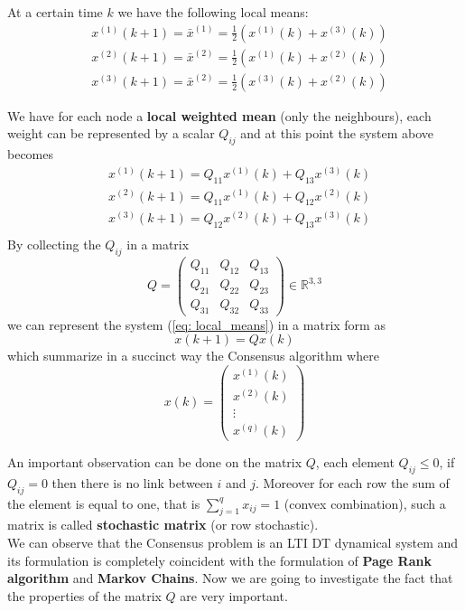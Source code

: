 At a certain time $k$ we have the following local means:
\begin{equation}    \label{eq: local_means}
    \begin{aligned}
        &x^{(1)}(k+1)=\bar{x}^{(1)} = \frac{1}{2} (x^{(1)}(k)+x^{(3)}(k))\\
        &x^{(2)}(k+1)=\bar{x}^{(2)} = \frac{1}{2} (x^{(1)}(k)+x^{(2)}(k))\\
        &x^{(3)}(k+1)=\bar{x}^{(2)} = \frac{1}{2} (x^{(3)}(k)+x^{(2)}(k))
    \end{aligned}
\end{equation}

\noindent
We have for each node a \textbf{local weighted mean} (only the neighbours), each weight can be represented by a scalar $Q_{ij}$ and at this point the system above becomes
\begin{equation}
    \begin{aligned}
        &x^{(1)}(k+1)= Q_{11} x^{(1)}(k)+Q_{13}x^{(3)}(k)\\
        &x^{(2)}(k+1)= Q_{11} x^{(1)}(k)+Q_{12}x^{(2)}(k)\\
        &x^{(3)}(k+1)= Q_{12} x^{(2)}(k)+Q_{13}x^{(3)}(k)\\
    \end{aligned}
\end{equation}
By collecting the $Q_{ij}$ in a matrix 
$$Q=\begin{pmatrix}
    Q_{11}&Q_{12}&Q_{13}\\
    Q_{21}&Q_{22}&Q_{23}\\
    Q_{31}&Q_{32}&Q_{33}
\end{pmatrix}
    \in\mathbb{R}^{3,3}$$
we can represent the system (\ref{eq: local_means}) in a matrix form as
\begin{equation}
    x(k+1)=Qx(k)
\end{equation}
which summarize in a succinct way the Consensus algorithm where
$$x(k)=\begin{pmatrix} x^{(1)}(k)\\x^{(2)}(k)\\\vdots\\x^{(q)}(k) \end{pmatrix}$$ 

An important observation can be done on the matrix $Q$, each element $Q_{ij}\le 0$, if $Q_{ij}=0$ then there is no link between $i$ and $j$. Moreover for each row the sum of the element is equal to one, that is $\sum_{j=1}^q x_{ij}=1$ (convex combination), such a matrix is called \textbf{stochastic matrix} (or row stochastic).\\
We can observe that the Consensus problem is an LTI DT dynamical system and its formulation is completely coincident with the formulation of \textbf{Page Rank algorithm} and \textbf{Markov Chains}. Now we are going to investigate the fact that the properties of the matrix $Q$ are very important.

